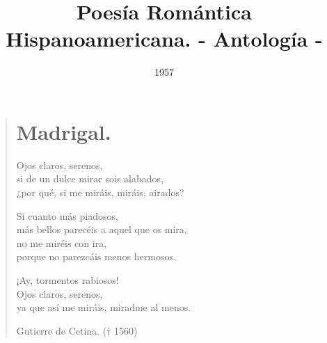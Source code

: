 \documentclass[12pt, twoside]{book}
\date{1957}
\title{\Huge{Poesía Romántica Hispanoamericana. \newline \LARGE{- Antología -}}}
\author{}
\begin{document}
\maketitle
\tableofcontents
\clearpage
\onehalfspacing
\thispagestyle{empty}
\newpage

\begin{verse}
\begin{center}
\section{Madrigal.}
\end{center}

Ojos claros, serenos,\\
si de un dulce mirar sois alabados,\\
¿por qué, si me miráis, miráis, airados?
\newline

Si cuanto más piadosos,\\
más bellos parecéis a aquel que os mira,\\
no me miréis con ira,\\
porque no parezcáis menos hermosos.\newline

¡Ay, tormentos rabiosos!\\
Ojos claros, serenos,\\
ya que así me miráis, miradme al menos.\newline

Gutierre de Cetina. ($\dagger$ 1560)
\end{verse}
\newpage
\end{document}
